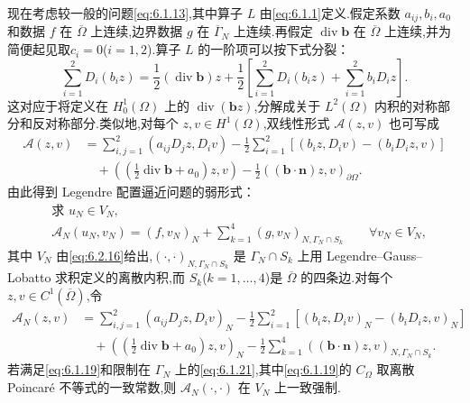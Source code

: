 现在考虑较一般的问题\eqref{eq:6.1.13},其中算子 \(L\) 由\eqref{eq:6.1.1}定义.假定系数 \(a_{ij},b_i,a_0\) 和数据 \(f\) 在 \(\overline\Omega\) 上连续,边界数据 \(g\) 在 \(\overline\Gamma_N\) 上连续.再假定 \(\operatorname{div}\boldsymbol{b}\) 在 \(\overline\Omega\) 上连续,并为简便起见取\(c_i=0\)(\(i=1,2\)).算子 \(L\) 的一阶项可以按下式分裂：
\begin{equation}\label{eq:6.2.34}
  \sum_{i=1}^2 D_i(b_i z)
    =\frac12(\operatorname{div}\boldsymbol{b})z
       +\frac12\left[\sum_{i=1}^2 D_i(b_i z)+\sum_{i=1}^2 b_iD_i z\right].
\end{equation}
这对应于将定义在 \(H_0^1(\Omega)\) 上的 \(\operatorname{div}(\boldsymbol{b}z)\),分解成关于 \(L^2(\Omega)\) 内积的对称部分和反对称部分.类似地,对每个 \(z,v\in H^1(\Omega)\),双线性形式 \(\mathcal A(z,v)\) 也可写成
\[
  \begin{aligned}
    \mathcal A(z,v)
      &=\sum_{i,j=1}^2(a_{ij}D_jz,D_iv)
        -\frac12\sum_{i=1}^2[(b_i z,D_iv)-(b_iD_i z,v)]\\
      &\quad+\left(\left(\frac12\operatorname{div}\boldsymbol{b}+a_0\right)z,v\right)
        -\frac12((\boldsymbol{b}\cdot\boldsymbol{n})z,v)_{\partial\Omega}.
  \end{aligned}
\]
由此得到 Legendre 配置逼近问题的弱形式：
\begin{equation}\label{eq:6.2.35}
  \begin{aligned}
    &\text{求 }u_N\in V_N,\\
    &\mathcal A_N(u_N,v_N)=(f,v_N)_N
     +\sum_{k=1}^4(g,v_N)_{N,\Gamma_N\cap S_k}\qquad\forall v_N\in V_N,
  \end{aligned}
\end{equation}
其中 \(V_N\) 由\eqref{eq:6.2.16}给出,\((\cdot,\cdot)_{N,\Gamma_N\cap S_k}\) 是 \(\Gamma_N\cap S_k\) 上用 Legendre--Gauss--Lobatto 求积定义的离散内积,而 \(S_k\)(\(k=1,\ldots,4\))是 \(\overline\Omega\) 的四条边.对每个 \(z,v\in C^1(\overline\Omega)\),令
\[
  \begin{aligned}
    \mathcal A_N(z,v)
    &=\sum_{i,j=1}^2(a_{ij}D_jz,D_iv)_N
       -\frac12\sum_{i=1}^2[(b_i z,D_iv)_N-(b_iD_i z,v)_N]\\
    &\quad+\left(\left(\frac12\operatorname{div}\boldsymbol{b}+a_0\right)z,v\right)_N
       -\frac12\sum_{k=1}^4((\boldsymbol{b}\cdot\boldsymbol{n})z,v)_{N,\Gamma_N\cap S_k}.
  \end{aligned}
\]
若满足\eqref{eq:6.1.19}和限制在 \(\Gamma_N\) 上的\eqref{eq:6.1.21},其中\eqref{eq:6.1.19}的 \(C_\Omega\) 取离散 Poincaré 不等式的一致常数,则 \(\mathcal A_N(\cdot,\cdot)\) 在 \(V_N\) 上一致强制.

